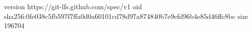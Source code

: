 version https://git-lfs.github.com/spec/v1
oid sha256:0fe038c5fb597f7ffa0d0a60101cd78d97a874840b7e9efd96b4e85d46ffc8bc
size 196704
